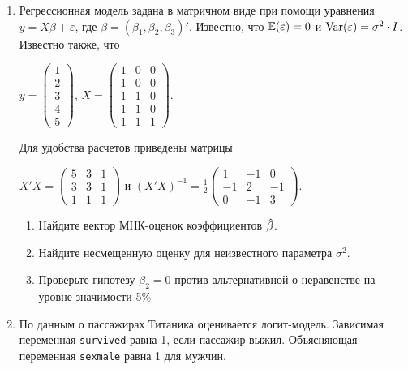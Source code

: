 \documentclass[12pt, a4paper]{article}\usepackage[]{graphicx}\usepackage[]{color}
\begin{document}
\begin{enumerate}
\item Регрессионная модель  задана в матричном виде при помощи уравнения $y=X\beta+\varepsilon$, где $\beta=(\beta_1,\beta_2,\beta_3)'$.
Известно, что $\mathbb{E}(\varepsilon)=0$  и  $\operatorname{Var}(\varepsilon)=\sigma^2\cdot I$.
Известно также, что

$y=\left(
\begin{array}{c}
1\\
2\\
3\\
4\\
5
\end{array}\right)$,
$X=\left(\begin{array}{ccc}
1 & 0 & 0 \\
1 & 0 & 0 \\
1 & 1 & 0 \\
1 & 1 & 0 \\
1 & 1 & 1
\end{array}\right)$.


Для удобства расчетов приведены матрицы


$X'X=\left(
\begin{array}{ccc}
5 & 3 & 1\\
3 & 3 & 1\\
1 & 1 & 1
\end{array}\right)$ и $(X'X)^{-1}=\frac{1}{2}\left(
\begin{array}{ccc}
1 & -1 & 0 \\
-1 & 2 & -1 \\
0 & -1 & 3
\end{array}\right)$.

\begin{enumerate}
\item Найдите вектор МНК-оценок коэффициентов $\hat{\beta}$.
\item Найдите несмещенную оценку для неизвестного параметра $\sigma^2$.
\item Проверьте гипотезу $\beta_2=0$ против альтернативной о неравенстве на уровне значимости 5\%

\end{enumerate}




\item По данным о пассажирах Титаника оценивается логит-модель. Зависимая переменная \verb|survived| равна 1, если пассажир выжил. Объясняющая переменная \verb|sexmale| равна 1 для  мужчин.



\end{enumerate}
\end{document}
